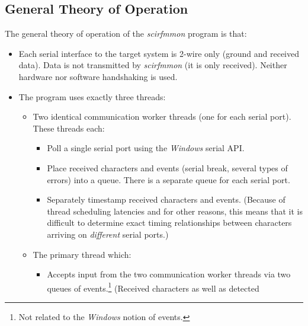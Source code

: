 \documentclass[letterpaper,10pt,titlepage]{article}
\newcommand{\productname}{scirfmmon}
\newcommand{\productnameemph}{\emph{\productname}}
\begin{document}
\subsection{General Theory of Operation} 
\label{sswd0:sgto0}

The general theory of operation of the \productnameemph{}
program is that:

\begin{itemize}
\item Each serial interface to the target system is
      2-wire only (ground and received data)\@.  Data is not
      transmitted by \productnameemph{}
      (it is only received).  Neither hardware nor software 
      handshaking
      is used.
\item The program uses exactly three threads:
      \begin{itemize}
      \item Two identical communication worker threads (one for each serial
            port)\@.  These threads each:
            \begin{itemize}
            \item Poll a single serial port using the 
                  \emph{Windows} serial API.
            \item Place received characters and events (serial
                  break, several types of errors) into a queue.  There is
                  a separate queue for each serial port.
            \item Separately timestamp received characters and events\@.  (Because
                  of thread scheduling latencies and for other reasons, 
                  this means that it is difficult to determine
                  exact timing relationships between characters arriving on
                  \emph{different} serial ports.)
            \end{itemize}
      \item The primary thread which:
            \begin{itemize}
            \item Accepts input from the two communication worker threads
                  via two queues of events.\footnote{Not related to the
                  \emph{Windows} notion of events.}  (Received characters 
                  as well as detected

\end{itemize}
\end{itemize}
\end{itemize}
\end{document}
